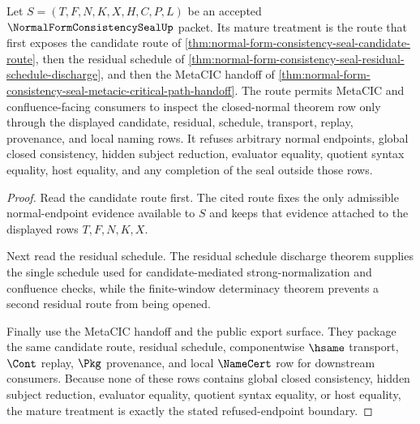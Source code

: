 \begin{theorem}
\label{thm:normal-form-consistency-seal-mature-treatment}
Let $S=(T,F,N,K,X,H,C,P,L)$ be an accepted $\NormalFormConsistencySealUp$ packet. Its mature treatment is the route that first exposes the candidate route of \autoref{thm:normal-form-consistency-seal-candidate-route}, then the residual schedule of \autoref{thm:normal-form-consistency-seal-residual-schedule-discharge}, and then the MetaCIC handoff of \autoref{thm:normal-form-consistency-seal-metacic-critical-path-handoff}. The route permits MetaCIC and confluence-facing consumers to inspect the closed-normal theorem row only through the displayed candidate, residual, schedule, transport, replay, provenance, and local naming rows. It refuses arbitrary normal endpoints, global closed consistency, hidden subject reduction, evaluator equality, quotient syntax equality, host equality, and any completion of the seal outside those rows.
\end{theorem}
\begin{proof}
Read the candidate route first. The cited route fixes the only admissible normal-endpoint evidence available to $S$ and keeps that evidence attached to the displayed rows $T,F,N,K,X$.

Next read the residual schedule. The residual schedule discharge theorem supplies the single schedule used for candidate-mediated strong-normalization and confluence checks, while the finite-window determinacy theorem prevents a second residual route from being opened.

Finally use the MetaCIC handoff and the public export surface. They package the same candidate route, residual schedule, componentwise $\hsame$ transport, $\Cont$ replay, $\Pkg$ provenance, and local $\NameCert$ row for downstream consumers. Because none of these rows contains global closed consistency, hidden subject reduction, evaluator equality, quotient syntax equality, or host equality, the mature treatment is exactly the stated refused-endpoint boundary.
\end{proof}
